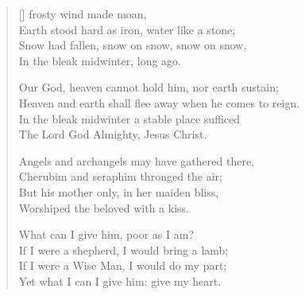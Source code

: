 \newHymn
{}

\begin{verse}[\versewidth]
 frosty wind made moan,\\
Earth stood hard as iron, water like a stone;\\
Snow had fallen, snow on snow, snow on snow,\\
In the bleak midwinter, long ago.

Our God, heaven cannot hold him, nor earth sustain;\\
Heaven and earth shall flee away when he comes to reign.\\
In the bleak midwinter a stable place sufficed\\
The Lord God Almighty, Jesus Christ.

Angels and archangels may have gathered there,\\
Cherubim and seraphim thronged the air;\\
But his mother only, in her maiden bliss,\\
Worshiped the beloved with a kiss.

What can I give him, poor as I am?\\
If I were a shepherd, I would bring a lamb;\\
If I were a Wise Man, I would do my part;\\
Yet what I can I give him: give my heart.

\end{verse}


